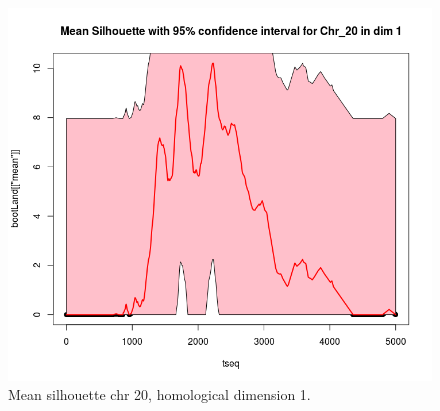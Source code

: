 \documentclass[12pt,a4paper]{article}
\begin{document}
\begin{figure}[hbtp]
\centering
\includegraphics[scale=0.75]{meanSil_chr20_dim1.png}
\caption{Mean silhouette chr 20, homological dimension 1.}
\label{fig:meanSil_chr20_dim1}
\end{figure}
\end{document}
